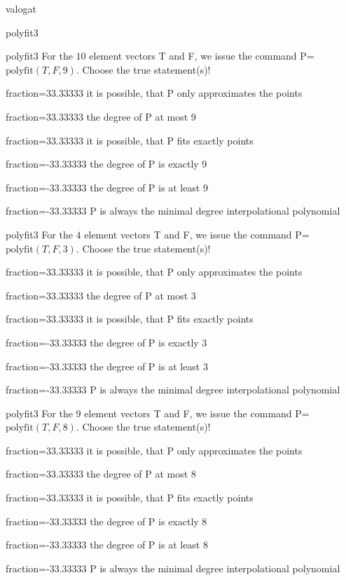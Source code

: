 \documentclass[12pt]{article}
\begin{document}
\begin{quiz}{valogat}
\begin{multi}[single=false]{polyfit3}
\end{multi}
\begin{multi}[single=false]{polyfit3}
For the $10$ element vectors T and F, we issue the command P=$\mathrm{polyfit}(T,F,9)$.
Choose the true statement(s)!
\item[fraction=33.33333] it is possible, that P only approximates the points
\item[fraction=33.33333] the degree of P at most 9
\item[fraction=33.33333] it is possible, that P fits exactly points
\item[fraction=-33.33333]  the degree of P is exactly 9
\item[fraction=-33.33333]  the degree of P is at least 9
\item[fraction=-33.33333]  P is always the minimal degree interpolational polynomial
\end{multi}
\begin{multi}[single=false]{polyfit3}
For the $4$ element vectors T and F, we issue the command P=$\mathrm{polyfit}(T,F,3)$.
Choose the true statement(s)!
\item[fraction=33.33333] it is possible, that P only approximates the points
\item[fraction=33.33333] the degree of P at most 3
\item[fraction=33.33333] it is possible, that P fits exactly points
\item[fraction=-33.33333]  the degree of P is exactly 3
\item[fraction=-33.33333]  the degree of P is at least 3
\item[fraction=-33.33333]  P is always the minimal degree interpolational polynomial
\end{multi}
\begin{multi}[single=false]{polyfit3}
For the $9$ element vectors T and F, we issue the command P=$\mathrm{polyfit}(T,F,8)$.
Choose the true statement(s)!
\item[fraction=33.33333] it is possible, that P only approximates the points
\item[fraction=33.33333] the degree of P at most 8
\item[fraction=33.33333] it is possible, that P fits exactly points
\item[fraction=-33.33333]  the degree of P is exactly 8
\item[fraction=-33.33333]  the degree of P is at least 8
\item[fraction=-33.33333]  P is always the minimal degree interpolational polynomial

\end{multi}
\end{quiz}
\end{document}
